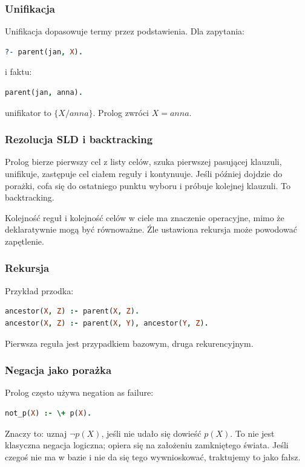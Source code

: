 \subsubsection{Unifikacja}

Unifikacja dopasowuje termy przez podstawienia. Dla zapytania:
\begin{lstlisting}[language=Prolog]
?- parent(jan, X).
\end{lstlisting}
i faktu:
\begin{lstlisting}[language=Prolog]
parent(jan, anna).
\end{lstlisting}
unifikator to $\{X/anna\}$. Prolog zwróci $X=anna$.

\subsubsection{Rezolucja SLD i backtracking}

Prolog bierze pierwszy cel z listy celów, szuka pierwszej pasującej klauzuli, unifikuje, zastępuje cel ciałem reguły i kontynuuje. Jeśli później dojdzie do porażki, cofa się do ostatniego punktu wyboru i próbuje kolejnej klauzuli. To backtracking.

Kolejność reguł i kolejność celów w ciele ma znaczenie operacyjne, mimo że deklaratywnie mogą być równoważne. Źle ustawiona rekursja może powodować zapętlenie.

\subsubsection{Rekursja}

Przykład przodka:
\begin{lstlisting}[language=Prolog]
ancestor(X, Z) :- parent(X, Z).
ancestor(X, Z) :- parent(X, Y), ancestor(Y, Z).
\end{lstlisting}
Pierwsza reguła jest przypadkiem bazowym, druga rekurencyjnym.

\subsubsection{Negacja jako porażka}

Prolog często używa negation as failure:
\begin{lstlisting}[language=Prolog]
not_p(X) :- \+ p(X).
\end{lstlisting}
Znaczy to: uznaj $\neg p(X)$, jeśli nie udało się dowieść $p(X)$. To nie jest klasyczna negacja logiczna; opiera się na założeniu zamkniętego świata. Jeśli czegoś nie ma w bazie i nie da się tego wywnioskować, traktujemy to jako fałsz.

